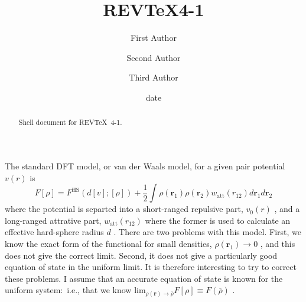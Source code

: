 \documentclass[aps,preprint]{revtex4-1}%
\begin{document}
\title[Short title for running header]{REV\TeX 4-1}
\author{First Author}
\author{Second Author}
\author{Third Author}

\begin{abstract}
Shell document for REV\TeX\ 4-1.

\end{abstract}
\date[Date text]{date}




\maketitle


The standard DFT model, or van der Waals model, for a given pair potential
$v\left(  r\right)  $ is
\begin{equation}
F\left[  \rho\right]  =F^{\text{HS}}\left(  d\left[  v\right]  ;\left[
\rho\right]  \right)  +\frac{1}{2}\int\rho\left(  \mathbf{r}_{1}\right)
\rho\left(  \mathbf{r}_{2}\right)  w_{\text{att}}\left(  r_{12}\right)
d\mathbf{r}_{1}d\mathbf{r}_{2}%
\end{equation}
where the potential is separted into a short-ranged repulsive part,
$v_{0}\left(  r\right)  $ , and a long-ranged attrative part, $w_{\text{att}%
}\left(  r_{12}\right)  $ where the former is used to calculate an effective
hard-sphere radius $d$ . There are two problems with this model. First, we
know the exact form of the functional for small densities, $\rho\left(
\mathbf{r}_{1}\right)  \rightarrow0$ , and this does not give the correct
limit. Second, it does not give a particularly good equation of state in the
uniform limit. It is therefore interesting to try to correct these problems. I
assume that an accurate equation of state is known for the uniform
system:\ i.e., that we know lim$_{\rho\left(  \mathbf{r}\right)
\rightarrow\overline{\rho}}F\left[  \rho\right]  \equiv F\left(
\overline{\rho}\right)  $ .
\end{document}
